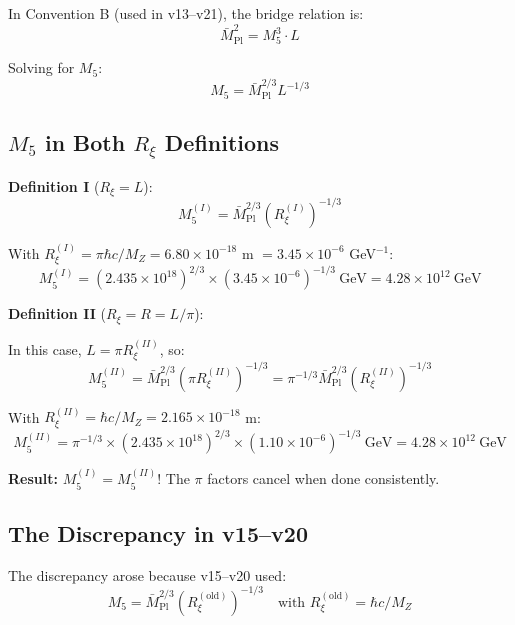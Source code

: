 \documentclass[11pt,a4paper]{article}
\newcommand{\Rxi}{R_\xi}
\newcommand{\Mplbar}{\bar{M}_{\mathrm{Pl}}}
\newcommand{\Mfive}{M_5}
\newcommand{\MZ}{M_Z}
\begin{document}
In Convention B (used in v13--v21), the bridge relation is:
\begin{equation}
\Mplbar^2 = \Mfive^3 \cdot L
\label{eq:bridge-B}
\end{equation}

Solving for $\Mfive$:
\begin{equation}
\Mfive = \Mplbar^{2/3} L^{-1/3}
\label{eq:M5-from-L}
\end{equation}

\subsection{$\Mfive$ in Both $\Rxi$ Definitions}

\textbf{Definition I} ($\Rxi = L$):
\begin{equation}
\Mfive^{(I)} = \Mplbar^{2/3} (\Rxi^{(I)})^{-1/3}
\label{eq:M5-def-I}
\end{equation}

With $\Rxi^{(I)} = \pi\hbar c/\MZ = 6.80 \times 10^{-18}$ m $= 3.45 \times 10^{-6}$ GeV$^{-1}$:
\begin{equation}
\Mfive^{(I)} = (2.435 \times 10^{18})^{2/3} \times (3.45 \times 10^{-6})^{-1/3}~\mathrm{GeV}
= 4.28 \times 10^{12}~\mathrm{GeV}
\label{eq:M5-I-numerical}
\end{equation}

\textbf{Definition II} ($\Rxi = R = L/\pi$):

In this case, $L = \pi \Rxi^{(II)}$, so:
\begin{equation}
\Mfive^{(II)} = \Mplbar^{2/3} (\pi \Rxi^{(II)})^{-1/3} = \pi^{-1/3} \Mplbar^{2/3} (\Rxi^{(II)})^{-1/3}
\label{eq:M5-def-II-correct}
\end{equation}

With $\Rxi^{(II)} = \hbar c/\MZ = 2.165 \times 10^{-18}$ m:
\begin{equation}
\Mfive^{(II)} = \pi^{-1/3} \times (2.435 \times 10^{18})^{2/3} \times (1.10 \times 10^{-6})^{-1/3}~\mathrm{GeV}
= 4.28 \times 10^{12}~\mathrm{GeV}
\label{eq:M5-II-numerical}
\end{equation}

\textbf{Result:} $\Mfive^{(I)} = \Mfive^{(II)}$! The $\pi$ factors cancel when done consistently.

\subsection{The Discrepancy in v15--v20}

The discrepancy arose because v15--v20 used:
\begin{equation}
\Mfive = \Mplbar^{2/3} (\Rxi^{(\mathrm{old})})^{-1/3} \quad \text{with } \Rxi^{(\mathrm{old})} = \hbar c/\MZ
\label{eq:v15-formula}
\end{equation}
\end{document}
